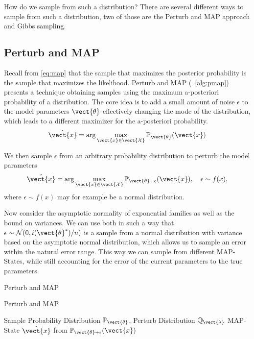 How do we sample from such a distribution? There are several different ways to sample from such a distribution, two of those are the Perturb and MAP approach and Gibbs sampling.


\subsection{Perturb and MAP}
\label{ssec:pmap}
Recall from \eq\ref{eq:map} that the sample that maximizes the posterior probability is the sample that maximizes the likelihood.
Perturb and MAP (\alg~\ref{alg:pmap}) presents a technique obtaining samples using the maximum a-posteriori probability of a distribution.
The core idea is to add a small amount of noise $\epsilon$ to the model parameters $\vect{\theta}$ effectively changing the mode of the distribution, which leads to a different maximizer for the a-posteriori probability. 
\begin{equation}
    \hat{\vect{x}}  = \arg\max_{\vect{x} \in \vect{\mathcal{X}}} \mathbb{P}_{\vect{\theta}}(\vect{x})
\end{equation}

We then sample $\epsilon$ from an arbitrary probability distribution to perturb the model parameters
\begin{equation}
    \hat{\vect{x}}  = \arg\max_{\vect{x} \in \vect{\mathcal{X}}} \mathbb{P}_{\vect{\theta} + \epsilon}(\vect{x}), \quad \epsilon \sim f(x),
\end{equation}
where $\epsilon \sim f(x)$ may for example be a normal distribution.

Now consider the asymptotic normality of exponential families as well as the bound on variances. 
We can use both in such a way that $\epsilon\sim \mathcal{N}(0, i(\vect{\theta}^*)/n)$ is a sample from a normal distribution with variance based on the asymptotic normal distribution, which allows us to sample an error within the natural error range.
This way we can sample from different MAP-States, while still accounting for the error of the current parameters \wrt to the true parameters.


\begin{algo}{Perturb and MAP~\cite{papandreou2011perturb}}
    \begin{algorithm}[H]
        \caption{Perturb and MAP}
        \begin{algorithmic}[1]
            \label{alg:pmap}
            \REQUIRE Sample Probability Distribution $\mathbb{P}_{\vect{\theta}}$, Perturb Distribution $\mathbb{Q}_{\vect{\lambda}}$
            \ENSURE  MAP-State $\hat{\vect{x}}$ from $\mathbb{P}_{\vect{\theta} + \epsilon}(\vect{x})$ \\
            \\
            \\
        \end{algorithmic}
    \end{algorithm}
\end{algo}

